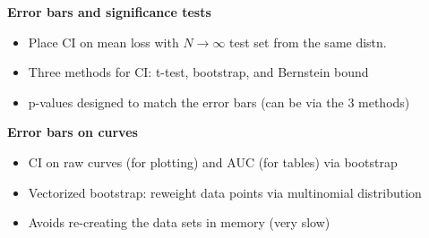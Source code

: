 \documentclass[a0,landscape]{a0poster}
\newcommand{\sectionx}{\textbf}
\begin{document}
\begin{multicols}{3}
\sectionx{Error bars and significance tests}
\begin{itemize}
  \item Place CI on mean loss with $N \rightarrow \infty$ test set from the same distn.
  \item Three methods for CI: t-test, bootstrap, and Bernstein bound
  \item p-values designed to match the error bars (can be via the 3 methods)
\end{itemize}

\sectionx{Error bars on curves}
\begin{itemize}
  \item CI on raw curves (for plotting) and AUC (for tables) via bootstrap
  \item Vectorized bootstrap: reweight data points via multinomial distribution
  \item Avoids re-creating the data sets in memory (very slow)
\end{itemize}

\end{multicols}

\vspace{1cm} %
\end{document}
